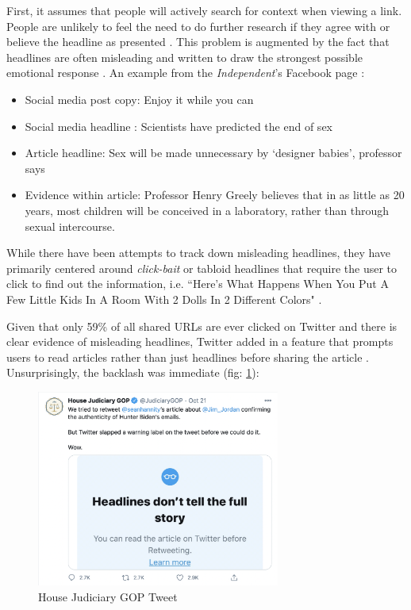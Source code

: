 \documentclass[preprint,review,12pt]{elsarticle}
\begin{document}
 First, it assumes that people will actively search for context when viewing a link. People are unlikely to feel the need to do further research if they agree with or believe the headline as presented \cite{nyhan2010corrections}. This problem is augmented by the fact that headlines are often misleading and written to draw the strongest possible emotional response \cite{chesney2017incongruent,ecker2014effects,bell1984good,molek2013towards,kilgo2018new,vettehen2008explaining}. An example from the \textit{Independent}'s Facebook page \cite{chesney2017incongruent}:
 \begin{itemize}
\item Social media post copy: Enjoy it while you
can
\item Social media headline \footnotemark[1]: Scientists have predicted the end of sex
\item Article headline\footnotemark[2]: Sex will be made unnecessary by ‘designer babies’, professor says
\item Evidence within article: Professor Henry Greely believes that in as little as 20 years, most children will be conceived in a laboratory, rather than through sexual intercourse.
 \end{itemize}
 
 While there have been attempts to track down misleading headlines, they have primarily centered around \textit{click-bait} or tabloid headlines \cite{chen2015misleading,chakraborty2016stop} that require the user to click to find out the information, i.e. ``Here’s What Happens When You Put A Few Little Kids In A Room With 2 Dolls In 2 Different Colors" \cite{chen2015misleading}. 
 
Given that only 59\% of all shared URLs are ever clicked on Twitter \cite{gabielkov2016social} and there is clear evidence of misleading headlines, Twitter added in a feature that prompts users to read articles rather than just headlines before sharing the article \cite{reuters2020article}. Unsurprisingly, the backlash was immediate (fig: \ref{fig:House Judiciary GOP Tweet}):
 \begin{figure}[htp]
    \centering
    \includegraphics[width=8cm]{JudiciaryTweet.png}
    \caption{House Judiciary GOP Tweet}
    \label{fig:House Judiciary GOP Tweet}
\end{figure}
\end{document}
